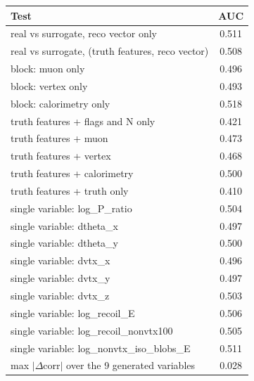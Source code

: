 \begin{tabular}{lc}
\toprule
Test & AUC \\
\midrule
real vs surrogate, reco vector only & 0.511 \\
real vs surrogate, (truth features, reco vector) & 0.508 \\
\midrule
block: muon only & 0.496 \\
block: vertex only & 0.493 \\
block: calorimetry only & 0.518 \\
truth features + flags and N only & 0.421 \\
truth features + muon & 0.473 \\
truth features + vertex & 0.468 \\
truth features + calorimetry & 0.500 \\
truth features + truth only & 0.410 \\
single variable: log\_P\_ratio & 0.504 \\
single variable: dtheta\_x & 0.497 \\
single variable: dtheta\_y & 0.500 \\
single variable: dvtx\_x & 0.496 \\
single variable: dvtx\_y & 0.497 \\
single variable: dvtx\_z & 0.503 \\
single variable: log\_recoil\_E & 0.506 \\
single variable: log\_recoil\_nonvtx100 & 0.505 \\
single variable: log\_nonvtx\_iso\_blobs\_E & 0.511 \\
\midrule
max $|\Delta$corr$|$ over the 9 generated variables & 0.028 \\
\bottomrule
\end{tabular}
